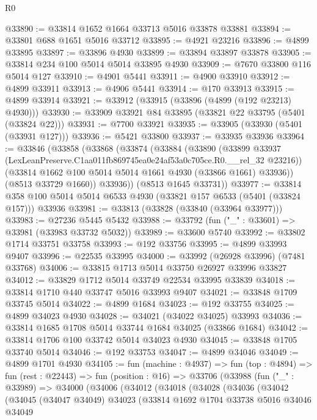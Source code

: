 \begin{lexlean}{R0}
\begin{coremodule}
@33890 := @33814 @1652 @1664 @33713 @5016 @33878 @33881
@33894 := @33801 @688 @1651 @5016 @33712
@33895 := @4921 @23216
@33896 := @4899 @33895
@33897 := @33896 @4930
@33899 := @33894 @33897 @33878
@33905 := @33814 @234 @100 @5014 @5014 @33895 @4930
@33909 := @7670 @33800 @116 @5014 @127
@33910 := @4901 @5441
@33911 := @4900 @33910
@33912 := @4899 @33911
@33913 := @4906 @5441
@33914 := @170 @33913
@33915 := @4899 @33914
@33921 := @33912 (@33915 (@33896 (@4899 (@192 @23213) @4930)))
@33930 := @33909 @33921 @84 @33895 (@33821 @22 @33795 (@5401 (@33824 @22)))
@33931 := @7700 @33921
@33935 := @33905 (@33930 (@5401 (@33931 @127)))
@33936 := @5421 @33800
@33937 := @33935 @33936
@33964 := @33846
    (@33858
      (@33868
        (@33874
          (@33884
            (@33890
              (@33899 @33937 (LexLeanPreserve.C1aa011fb869745ea0e24af53a0c705ce.R0.__rel_32 @23216))
              (@33814 @1662 @100 @5014 @5014 @1661 @4930 (@33866 @1661) @33936))
            (@8513 @33729 @1660))
          @33936))
      (@8513 @1645 @33731))
@33977 := @33814 @358 @100 @5014 @5014 @6533 @4930 (@33821 @157 @6533 (@5401 (@33824 @157))) @33936
@33981 := @33813 (@33828 (@33840 (@33964 @33977)))
@33983 := @27236 @5445 @5432
@33988 := @33792 (fun ("_" : @33601) => @33981 (@33983 @33732 @5032))
@33989 := @33600 @5740
@33992 := @33802 @1714 @33751 @33758
@33993 := @192 @33756
@33995 := @4899 @33993 @9407
@33996 := @22535 @33995
@34000 := @33992 (@26928 @33996) (@7481 @33768)
@34006 := @33815 @1713 @5014 @33750 @26927 @33996 @33827
@34012 := @33829 @1712 @5014 @33749 @22534 @33995 @33839
@34018 := @33814 @1710 @440 @33747 @5016 @33993 @9407
@34021 := @33848 @1709 @33745 @5014
@34022 := @4899 @1684
@34023 := @192 @33755
@34025 := @4899 @34023 @4930
@34028 := @34021 (@34022 @34025) @33993
@34036 := @33814 @1685 @1708 @5014 @33744 @1684 @34025 (@33866 @1684)
@34042 := @33814 @1706 @100 @33742 @5014 @34023 @4930
@34045 := @33848 @1705 @33740 @5014
@34046 := @192 @33753
@34047 := @4899 @34046
@34049 := @4899 @1701 @4930
@34105 := fun (machine : @4937) =>
  fun (top : @4894) =>
  fun (rest : @22443) =>
  fun (position : @16) =>
  @33706
    (@33988
      (fun ("_" : @33989) =>
      @34000
        (@34006
          (@34012
            (@34018
              (@34028
                (@34036
                  (@34042
                    (@34045
                      (@34047 @34049)
                      @34023
                      (@33814
                        @1692
                        @1704
                        @33738
                        @5016
                        @34046
                        @34049

\end{coremodule}
\end{lexlean}
